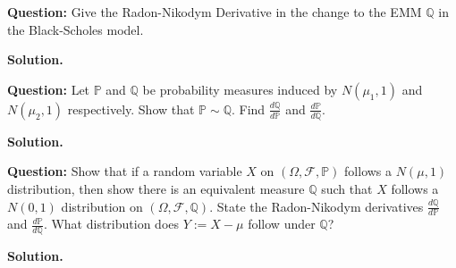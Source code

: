 \documentclass{article}
\begin{document}
\begin{tcolorbox}[colframe=black,colback=gray!5,boxrule=0.5pt]
\textbf{Question:} Give the Radon-Nikodym Derivative in the change to the EMM $\mathbb{Q}$ in the Black-Scholes model. 
\end{tcolorbox}
\textbf{Solution.}

\begin{tcolorbox}[colframe=black,colback=gray!5,boxrule=0.5pt]
\textbf{Question:} Let $\mathbb{P}$ and $\mathbb{Q}$ be probability measures induced by $N(\mu_1,1)$ and $N(\mu_2,1)$ respectively. Show that $\mathbb{P}\sim\mathbb{Q}$. Find $\frac{d\mathbb{Q}}{d\mathbb{P}}$ and $\frac{d\mathbb{P}}{d\mathbb{Q}}$.
\end{tcolorbox}
\textbf{Solution.}


\begin{tcolorbox}[colframe=black,colback=gray!5,boxrule=0.5pt]
\textbf{Question:} Show that if a random variable $X$ on $(\Omega, \mathcal{F}, \mathbb{P})$ follows a $N(\mu,1)$ distribution, then show there is an equivalent measure $\mathbb{Q}$ such that $X$ follows a $N(0,1)$ distribution on $(\Omega, \mathcal{F},\mathbb{Q}).$ State the Radon-Nikodym derivatives $\frac{d\mathbb{Q}}{d\mathbb{P}}$ and $\frac{d\mathbb{P}}{d\mathbb{Q}}$. What distribution does $Y:=X-\mu$ follow under $\mathbb{Q}$?
\end{tcolorbox}
\textbf{Solution.}
\end{document}
